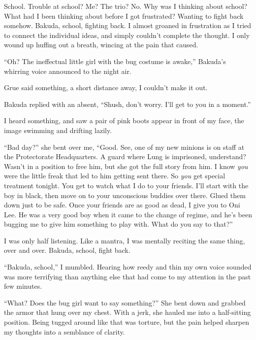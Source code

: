 School.  Trouble at school?  Me?  The trio?  No.  Why was I thinking about school?  What had I been thinking about before I got frustrated?  Wanting to fight back somehow.  Bakuda, school, fighting back.  I almost groaned in frustration as I tried to connect the individual ideas, and simply couldn't complete the thought.  I only wound up huffing out a breath, wincing at the pain that caused.



``Oh?  The ineffectual little girl with the bug costume is awake,'' Bakuda's whirring voice announced to the night air.



Grue said something, a short distance away, I couldn't make it out.



Bakuda replied with an absent, ``Shush, don't worry.  I'll get to you in a moment.''



I heard something, and saw a pair of pink boots appear in front of my face, the image swimming and drifting lazily.



``Bad day?'' she bent over me, ``Good.  See, one of my new minions is on staff at the Protectorate Headquarters.  A guard where Lung is imprisoned, understand?  Wasn't in a position to free him, but she got the full story from him.  I know \emph{you} were the little freak that led to him getting sent there.  So \emph{you} get special treatment tonight.  You get to watch what I do to your friends.  I'll start with the boy in black, then move on to your unconscious buddies over there.  Glued them down just to be safe.  Once your friends are as good as dead, I give you to Oni Lee.  He was a very good boy when it came to the change of regime, and he's been bugging me to give him something to play with.  What do you say to that?''



I was only half listening.  Like a mantra, I was mentally reciting the same thing, over and over.  Bakuda, school, fight back.



``Bakuda, school,'' I mumbled.  Hearing how reedy and thin my own voice sounded was more terrifying than anything else that had come to my attention in the past few minutes.



``What?  Does the bug girl want to say something?''  She bent down and grabbed the armor that hung over my chest.  With a jerk, she hauled me into a half-sitting position.  Being tugged around like that was torture, but the pain helped sharpen my thoughts into a semblance of clarity.




